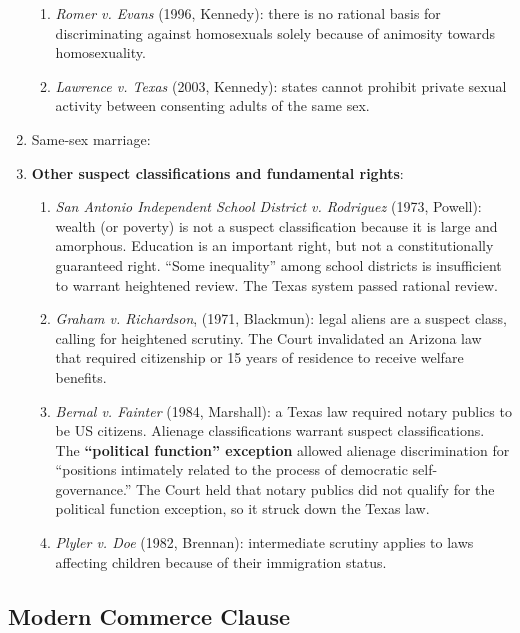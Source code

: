 \begin{enumerate}
\begin{enumerate}
        \item \emph{Romer v. Evans} (1996, Kennedy): there is no rational 
        basis for discriminating against homosexuals solely because of 
        animosity towards homosexuality.
        \item \emph{Lawrence v. Texas} (2003, Kennedy): states cannot prohibit 
        private sexual activity between consenting adults of the same sex. 
    \end{enumerate}
    \item Same-sex marriage:
    \item \textbf{Other suspect classifications and fundamental rights}:
    \begin{enumerate}
        \item \emph{San Antonio Independent School District v. Rodriguez} 
        (1973, Powell): wealth (or poverty) is not a suspect classification 
        because it is large and amorphous. Education is an important right, 
        but not a constitutionally guaranteed right. ``Some inequality'' among 
        school districts is insufficient to warrant heightened review. The 
        Texas system passed rational review.
        \item \emph{Graham v. Richardson}, (1971, Blackmun): legal aliens are 
        a suspect class, calling for heightened scrutiny. The Court 
        invalidated an Arizona law that required citizenship or 15 years of 
        residence to receive welfare benefits.
        \item \emph{Bernal v. Fainter} (1984, Marshall): a Texas law required 
        notary publics to be US citizens. Alienage classifications warrant 
        suspect classifications. The \textbf{``political function'' exception} 
        allowed alienage discrimination for ``positions intimately related to 
        the process of democratic self-governance.'' The Court held that 
        notary publics did not qualify for the political function exception, 
        so it struck down the Texas law.
        \item \emph{Plyler v. Doe} (1982, Brennan): intermediate scrutiny 
        applies to laws affecting children because of their immigration 
        status.
    \end{enumerate}
\end{enumerate}

\subsection{Modern Commerce Clause}

